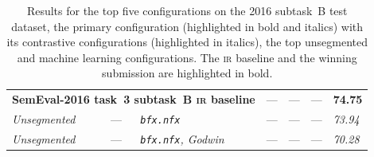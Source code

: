 \documentclass[
  digital, %
  notable, %
  lof,     %
  lot,     %
  nopalatino, color
]{fithesis3}
\newenvironment{liningfigs}{\renewcommand*{\rmdefault}{zpltlf}\normalfont}{}
\def\abbr#1{\textsc{\MakeLowercase{#1}}}
\begin{document}
\begin{table}
\begin{liningfigs}
\begin{tabular}{lllllll}
\multicolumn{3}{l}{\bfseries SemEval-2016 task~3 subtask~B \abbr{IR}\index{ir@\protect\abbr{IR}} baseline} &
  --- &
  --- &
  --- &
  \bfseries74.75 \\
\itshape Unsegmented &
  --- &
  \itshape\texttt{bfx.nfx} &
  --- &
  --- &
  --- &
  \itshape73.94 \\
\itshape Unsegmented &
  --- &
  \itshape\texttt{bfx.nfx}, Godwin &
  --- &
  --- &
  --- &
  \itshape70.28 \\
\end{tabular}
\end{liningfigs}
\label{tab:segmentation-results-2016}
\caption[Results for the top five configurations on the 2016
subtask~B test dataset]{%
  Results for the top five configurations on the 2016
  subtask~B test dataset, the primary configuration (highlighted in bold
  and italics) with its contrastive configurations (highlighted in italics),
  the top unsegmented and machine learning configurations. The
  \abbr{IR} baseline and the winning submission are highlighted in
  bold.}
\end{table}
\end{document}
